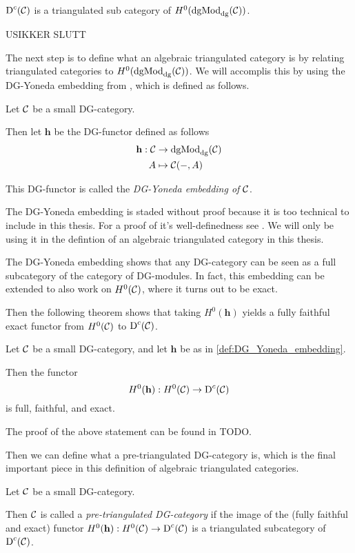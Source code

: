 \begin{proposition}
    \( \operatorname{D}^c({\mathcal{C}}) \) is a triangulated sub category of \( H^0(\operatorname{dgMod}_{\operatorname{dg}}({\mathcal{C}})) \).
\end{proposition}

USIKKER SLUTT

The next step is to define what an algebraic triangulated category is by relating triangulated categories to \( H^0(\operatorname{dgMod}_{\operatorname{dg}}({\mathcal{C}})) \). We will accomplis this by using the DG-Yoneda embedding from \cite[Corollary 6.3.6]{Borceux_1994}, which is defined as follows.
\begin{definition}
    \label{def:DG_Yoneda_embedding}
    Let \( {\mathcal{C}} \) be a small DG-category.
    
    Then let \( \mathbf{h} \) be the DG-functor defined as follows
    \begin{align*}
        \mathbf{h}: {\mathcal{C}} &\to \operatorname{dgMod}_{\operatorname{dg}}({\mathcal{C}}) \\
        A &\mapsto {\mathcal{C}}(-, A)
    \end{align*}

    This DG-functor is called the \emph{DG-Yoneda embedding of \( {\mathcal{C}} \)}.
\end{definition}

The DG-Yoneda embedding is staded without proof because it is too technical to include in this thesis. For a proof of it's well-definedness see \cite[Corollary 6.3.6]{Borceux_1994}. We will only be using it in the defintion of an algebraic triangulated category in this thesis.

The DG-Yoneda embedding shows that any DG-category can be seen as a full subcategory of the category of DG-modules. In fact, this embedding can be extended to also work on \( H^0({\mathcal{C}}) \), where it turns out to be exact.

Then the following theorem shows that taking \( H^0(\mathbf{h}) \) yields a fully faithful exact functor from \( H^0({\mathcal{C}}) \) to \( \operatorname{D}^c({\mathcal{C}}) \).

\begin{theorem}
    Let \( {\mathcal{C}} \) be a small DG-category, and let \( \mathbf{h} \) be as in \autoref{def:DG_Yoneda_embedding}.

    Then the functor
    \[
        H^0(\mathbf{h}): H^0({\mathcal{C}}) \to \operatorname{D}^c({\mathcal{C}})
    \]
    is full, faithful, and exact.
\end{theorem}
The proof of the above statement can be found in TODO.

Then we can define what a pre-triangulated DG-category is, which is the final important piece in this definition of algebraic triangulated categories.
\begin{definition}
    Let \( {\mathcal{C}} \) be a small DG-category.

    Then \( {\mathcal{C}} \) is called a \emph{pre-triangulated DG-category} if the image of the (fully faithful and exact) functor \( H^0(\mathbf{h}): H^0({\mathcal{C}}) \to \operatorname{D}^c({\mathcal{C}}) \) is a triangulated subcategory of \( \operatorname{D}^c({\mathcal{C}}) \).
\end{definition}

